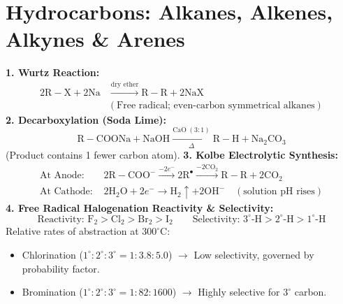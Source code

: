 \documentclass[10pt,twoside,openright]{book}
\begin{document}
\section{Hydrocarbons: Alkanes, Alkenes, Alkynes \& Arenes}

\begin{formulabox}
\textbf{1. Wurtz Reaction:}
\begin{align*}
  2\mathrm{R-X} + 2\mathrm{Na} &\xrightarrow{\text{dry ether}} \mathrm{R-R} + 2\mathrm{NaX} \\
  &(\text{Free radical; even-carbon symmetrical alkanes})
\end{align*}
\textbf{2. Decarboxylation (Soda Lime):}
\begin{equation*}
  \mathrm{R-COONa} + \mathrm{NaOH} \xrightarrow[\Delta]{\mathrm{CaO}\; (3:1)} \mathrm{R-H} + \mathrm{Na_2CO_3}
\end{equation*}
(Product contains 1 fewer carbon atom).
\textbf{3. Kolbe Electrolytic Synthesis:}
\begin{align*}
  \text{At Anode: } & 2\mathrm{R-COO}^- \xrightarrow{-2e^-} 2\mathrm{R}^\bullet \xrightarrow{-2\mathrm{CO}_2} \mathrm{R-R} + 2\mathrm{CO}_2\\
  \text{At Cathode: } & 2\mathrm{H_2O} + 2e^- \to \mathrm{H}_2 \uparrow + 2\mathrm{OH}^- \quad (\text{solution pH rises})
\end{align*}
\textbf{4. Free Radical Halogenation Reactivity \& Selectivity:}
\begin{equation}
  \text{Reactivity: } \mathrm{F}_2 > \mathrm{Cl}_2 > \mathrm{Br}_2 > \mathrm{I}_2 \qquad \text{Selectivity: } 3^\circ\text{-H} > 2^\circ\text{-H} > 1^\circ\text{-H}
\end{equation}
Relative rates of abstraction at $300^\circ\mathrm{C}$:
\begin{itemize}
  \item Chlorination ($1^\circ : 2^\circ : 3^\circ = 1 : 3.8 : 5.0$) $\to$ Low selectivity, governed by probability factor.
  \item Bromination ($1^\circ : 2^\circ : 3^\circ = 1 : 82 : 1600$) $\to$ Highly selective for $3^\circ$ carbon.
\end{itemize}
\end{formulabox}
\end{document}

